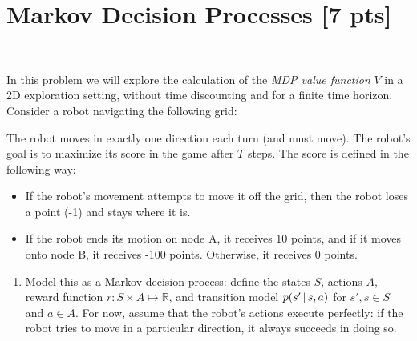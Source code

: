 \documentclass[submit]{harvardml}
\begin{document}
\newpage

\section*{Markov Decision Processes [7 pts]}
\begin{problem}
  ~

  
  \noindent In this problem we will explore the calculation of the \emph{MDP value function} $V$  in a 2D exploration setting, without time discounting and
for a finite time horizon. 
%
Consider a robot navigating the following grid:\\
  \begin{center}
\end{center}
The robot moves in exactly one direction each turn (and must move). The robot's goal is to maximize its score in the game after $T$ steps. The
score is defined in the following way:
%
\begin{itemize}
  \item If the robot's movement attempts to move it off the grid, then
    the robot loses a point (-1) and stays where it is.
  \item If the robot ends its motion on node A, it receives 10 points,
    and if it moves onto node B, it receives -100 points. Otherwise, it
    receives 0 points.  
\end{itemize}

  \begin{enumerate}
    \item Model this as a Markov decision process: define the states $S$, actions $A$, reward function $r:S\times A\mapsto \mathbb{R}$, and transition model $p(s'\,|\, s, a)$ for $s', s\in S$ and $a\in A$.  For now, assume that the robot's actions execute perfectly: if the robot tries to move in a particular direction, it always succeeds in doing so.


\end{enumerate}
\end{problem}
\end{document}
